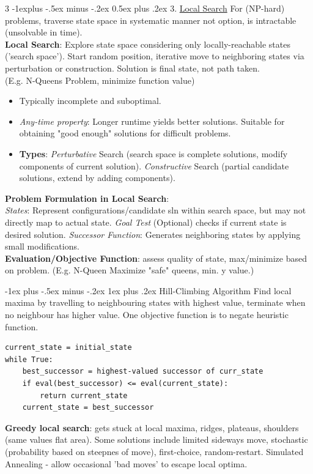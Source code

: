 \documentclass[a4paper, 9pt, landscape]{article}
\makeatletter
\renewcommand{\subsection}{\@startsection{subsection}{2}{0mm}%
                                {-1explus -.5ex minus -.2ex}%
                                {0.5ex plus .2ex}%
                                {\normalfont\normalsize\bfseries}}
\renewcommand{\subsubsection}{\@startsection{subsubsection}{3}{0mm}%
                                {-1ex plus -.5ex minus -.2ex}%
                                {1ex plus .2ex}%
                                {\normalfont\small\bfseries}}
\makeatother
\begin{document}
\begin{multicols*}{3}
\subsection{3. \underline{Local Search}}
For (NP-hard) problems,  traverse state space in systematic manner not option, is intractable (unsolvable in time). \\ \smallskip
\textbf{Local Search}: Explore state space considering only locally-reachable states ('search space').  Start random position, iterative move to neighboring states via perturbation or construction. Solution is final state, not path taken. \\
(E.g. N-Queens Problem, minimize function value) 
\begin{itemize}
\item Typically incomplete and suboptimal. 
\item \textit{Any-time property}: Longer runtime yields better solutions. Suitable for obtaining "good enough" solutions for difficult problems.
\item \textbf{Types}: \textit{Perturbative} Search (search space is complete solutions, modify components of current solution). \textit{Constructive} Search (partial candidate solutions, extend by adding components).
\end{itemize}
\textbf{Problem Formulation in Local Search}: \\
\textit{States}: Represent configurations/candidate sln within search space, but may not directly map to actual state. \textit{Goal Test} (Optional) checks if current state is desired solution. \textit{Successor Function}: Generates neighboring states by applying small modifications. \\
\textbf{Evaluation/Objective Function}: assess quality of state, max/minimize based on problem. (E.g. N-Queen Maximize "safe" queens, min. y value.)

\subsubsection{Hill-Climbing Algorithm}
Find local maxima by travelling to neighbouring states with highest value, terminate when no neighbour has higher value. 
One objective function is to negate heuristic function.
\begin{verbatim}
current_state = initial_state
while True:
    best_successor = highest-valued successor of curr_state
    if eval(best_successor) <= eval(current_state):
        return current_state
    current_state = best_successor
\end{verbatim}
\textbf{Greedy local search}: gets stuck at local maxima, ridges, plateaus, shoulders (same values flat area). Some solutions include limited sideways move, stochastic (probability based on steepnes of move), first-choice, random-restart. Simulated Annealing - allow occasional 'bad moves' to escape local optima.



\end{multicols*}
\end{document}
